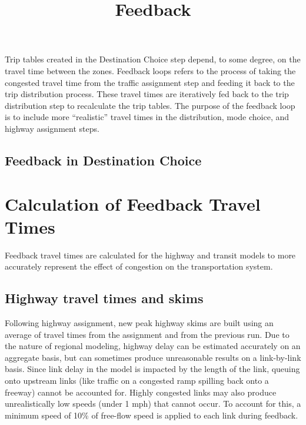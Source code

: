 \documentclass[
]{article}
\title{Feedback}
\author{}
\date{\vspace{-2.5em}}
\begin{document}
\maketitle

{
\setcounter{tocdepth}{4}
\tableofcontents
}
Trip tables created in the Destination Choice step depend, to some
degree, on the travel time between the zones. Feedback loops refers to
the process of taking the congested travel time from the traffic
assignment step and feeding it back to the trip distribution process.
These travel times are iteratively fed back to the trip distribution
step to recalculate the trip tables. The purpose of the feedback loop is
to include more ``realistic'' travel times in the distribution, mode
choice, and highway assignment steps.

\subsection{Feedback in Destination
Choice}\label{feedback-in-destination-choice}

\section{Calculation of Feedback Travel
Times}\label{calculation-of-feedback-travel-times}

Feedback travel times are calculated for the highway and transit models
to more accurately represent the effect of congestion on the
transportation system.

\subsection{Highway travel times and
skims}\label{highway-travel-times-and-skims}

Following highway assignment, new peak highway skims are built using an
average of travel times from the assignment and from the previous run.
Due to the nature of regional modeling, highway delay can be estimated
accurately on an aggregate basis, but can sometimes produce unreasonable
results on a link-by-link basis. Since link delay in the model is
impacted by the length of the link, queuing onto upstream links (like
traffic on a congested ramp spilling back onto a freeway) cannot be
accounted for. Highly congested links may also produce unrealistically
low speeds (under 1 mph) that cannot occur. To account for this, a
minimum speed of 10\% of free-flow speed is applied to each link during
feedback.
\end{document}
